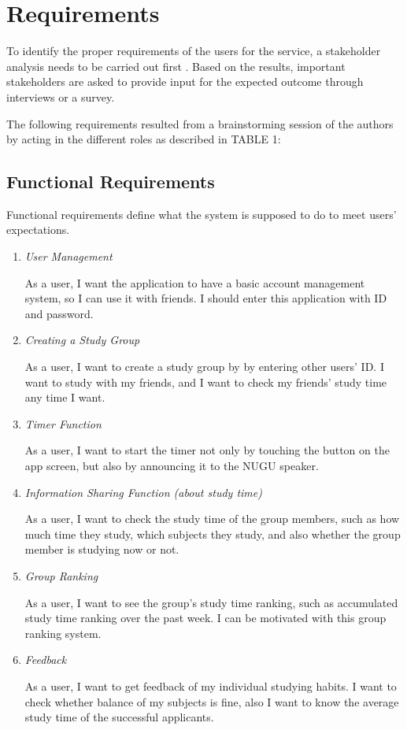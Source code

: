 \documentclass[conference]{IEEEtran}
\begin{document}
\section{Requirements}

To identify the proper requirements of the users for the service, a stakeholder analysis needs to be carried out first \cite{b4}. Based on the results, important stakeholders are asked to provide input for the expected outcome through interviews or a survey.

The following requirements resulted from a brainstorming session of the authors by acting in the different roles as described in TABLE 1:


\subsection{Functional Requirements}

Functional requirements define what the system is supposed to do to meet users’ expectations. 

\begin{enumerate}
\item \textit{User Management}

As a user, I want the application to have a basic account management system, so I can use it with friends. I should enter this application with ID and password.
\item \textit{Creating a Study Group}

As a user, I want to create a study group by by entering other users’ ID. I want to study with my friends, and I want to check my friends’ study time any time I want.
\item \textit{Timer Function}

As a user, I want to start the timer not only by touching the button on the app screen, but also by announcing it to the NUGU speaker. 
\item \textit{Information Sharing Function (about study time)}

As a user, I want to check the study time of the group members, such as how much time they study, which subjects they study, and also whether the group member is studying now or not.
\item \textit{Group Ranking}

As a user, I want to see the group’s study time ranking, such as accumulated study time ranking over the past week. I can be motivated with this group ranking system.
\item \textit{Feedback}

 As a user, I want to get feedback of my individual studying habits. I want to check whether balance of my subjects is fine, also I want to know the average study time of the successful applicants.
\end{enumerate}
\end{document}
